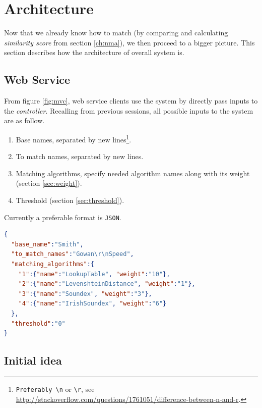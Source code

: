 \chapter{Architecture}
\label{ch:architecture}

Now that we already know how to match (by comparing and calculating
\emph{similarity score} from section \ref{ch:nma}), we then proceed
to a bigger picture. This section describes how the architecture
of overall system is.

\section{Web Service}
\label{sec:ws}

From figure \ref{fig:mvc}, web service clients use the system
by directly pass inputs to the \emph{controller}. Recalling
from previous sessions, all possible inputs to the system
are as follow.

\begin{enumerate}
  \item Base names, separated by
        new lines\footnote{\texttt{Preferably \textbackslash n} or \texttt{\textbackslash r}, see \url{http://stackoverflow.com/questions/1761051/difference-between-n-and-r}.}.
  \item To match names, separated by new lines.
  \item Matching algorithms, specify needed algorithm names along with its weight (section \ref{sec:weight}).
  \item Threshold (section \ref{sec:threshold}).
\end{enumerate}

Currently a preferable format is \texttt{JSON}.

\begin{minipage}{\linewidth}
\begin{lstlisting}[language={json}, label={lst:json}, caption={\texttt{JSON}.}]
{
  "base_name":"Smith",
  "to_match_names":"Gowan\r\nSpeed",
  "matching_algorithms":{
    "1":{"name":"LookupTable", "weight":"10"},
    "2":{"name":"LevenshteinDistance", "weight":"1"},
    "3":{"name":"Soundex", "weight":"3"},
    "4":{"name":"IrishSoundex", "weight":"6"}
  },
  "threshold":"0"
}
\end{lstlisting}
\end{minipage}

\section{Initial idea}
\label{sec:initialidea}

